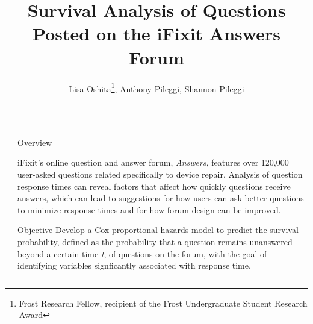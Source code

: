 \documentclass[final]{beamer}
\title{Survival Analysis of Questions Posted on the iFixit Answers Forum} %
\author{Lisa Oshita\footnote{Frost Research Fellow, recipient of the Frost Undergraduate Student Research Award}, Anthony Pileggi, Shannon Pileggi} %
\institute{Department of Statistics, California Polytechnic State University} %
\newlength{\sepwid}
\newlength{\onecolwid}
\begin{document}

\setlength{\belowcaptionskip}{2ex} %
\setlength\belowdisplayshortskip{2ex} %

\begin{frame}[t] %

\begin{columns}[t] %

\begin{column}{\sepwid}\end{column} %

\begin{column}{\onecolwid} %


\begin{alertblock}{Overview}

\textcolor{dblue!70}{} iFixit's online question and answer forum, \textit{Answers}, features over 120,000 user-asked questions related specifically to device repair. Analysis of question response times can reveal factors that affect how quickly questions receive answers, which can lead to suggestions for how users can ask better questions to minimize response times and for how forum design can be improved. 

\textcolor{dblue!70}{} \underline{Objective} Develop a Cox proportional hazards model to predict the survival probability, defined as the probability that a question remains unanswered beyond a certain time \textit{t}, of questions on the forum, with the goal of identifying variables signficantly associated with response time.

\end{alertblock}



\end{column}
\end{columns}
\end{frame}
\end{document}
